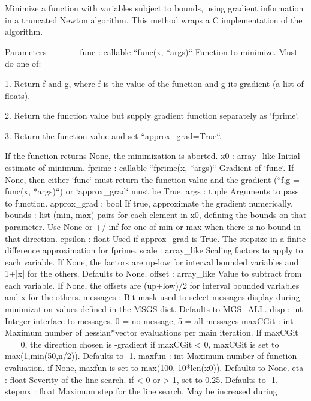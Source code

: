 \begin{DoxyVerb}Minimize a function with variables subject to bounds, using
gradient information in a truncated Newton algorithm. This
method wraps a C implementation of the algorithm.

Parameters
----------
func : callable ``func(x, *args)``
    Function to minimize.  Must do one of:

    1. Return f and g, where f is the value of the function and g its
       gradient (a list of floats).

    2. Return the function value but supply gradient function
       separately as `fprime`.

    3. Return the function value and set ``approx_grad=True``.

    If the function returns None, the minimization
    is aborted.
x0 : array_like
    Initial estimate of minimum.
fprime : callable ``fprime(x, *args)``
    Gradient of `func`. If None, then either `func` must return the
    function value and the gradient (``f,g = func(x, *args)``)
    or `approx_grad` must be True.
args : tuple
    Arguments to pass to function.
approx_grad : bool
    If true, approximate the gradient numerically.
bounds : list
    (min, max) pairs for each element in x0, defining the
    bounds on that parameter. Use None or +/-inf for one of
    min or max when there is no bound in that direction.
epsilon : float
    Used if approx_grad is True. The stepsize in a finite
    difference approximation for fprime.
scale : array_like
    Scaling factors to apply to each variable.  If None, the
    factors are up-low for interval bounded variables and
    1+|x| for the others.  Defaults to None.
offset : array_like
    Value to subtract from each variable.  If None, the
    offsets are (up+low)/2 for interval bounded variables
    and x for the others.
messages :
    Bit mask used to select messages display during
    minimization values defined in the MSGS dict.  Defaults to
    MGS_ALL.
disp : int
    Integer interface to messages.  0 = no message, 5 = all messages
maxCGit : int
    Maximum number of hessian*vector evaluations per main
    iteration.  If maxCGit == 0, the direction chosen is
    -gradient if maxCGit < 0, maxCGit is set to
    max(1,min(50,n/2)).  Defaults to -1.
maxfun : int
    Maximum number of function evaluation.  if None, maxfun is
    set to max(100, 10*len(x0)).  Defaults to None.
eta : float
    Severity of the line search. if < 0 or > 1, set to 0.25.
    Defaults to -1.
stepmx : float
    Maximum step for the line search.  May be increased during

\end{DoxyVerb}
